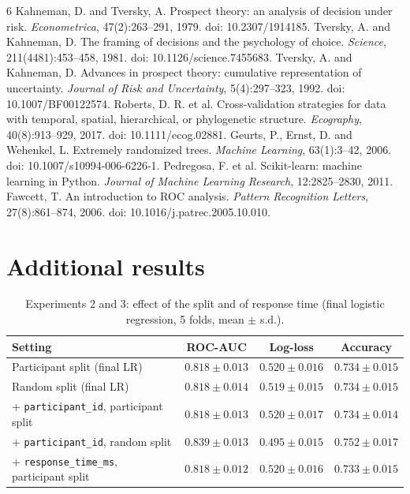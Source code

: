 \documentclass[11pt,a4paper]{article}
\begin{document}

\begin{thebibliography}{6}
Kahneman, D. and Tversky, A. Prospect theory: an analysis of decision under risk.
\emph{Econometrica}, 47(2):263--291, 1979. doi: 10.2307/1914185.
Tversky, A. and Kahneman, D. The framing of decisions and the psychology of choice.
\emph{Science}, 211(4481):453--458, 1981. doi: 10.1126/science.7455683.
Tversky, A. and Kahneman, D. Advances in prospect theory: cumulative representation of uncertainty.
\emph{Journal of Risk and Uncertainty}, 5(4):297--323, 1992. doi: 10.1007/BF00122574.
Roberts, D. R. et al. Cross-validation strategies for data with temporal, spatial, hierarchical, or phylogenetic structure.
\emph{Ecography}, 40(8):913--929, 2017. doi: 10.1111/ecog.02881.
Geurts, P., Ernst, D. and Wehenkel, L. Extremely randomized trees.
\emph{Machine Learning}, 63(1):3--42, 2006. doi: 10.1007/s10994-006-6226-1.
Pedregosa, F. et al. Scikit-learn: machine learning in Python.
\emph{Journal of Machine Learning Research}, 12:2825--2830, 2011.
Fawcett, T. An introduction to ROC analysis.
\emph{Pattern Recognition Letters}, 27(8):861--874, 2006. doi: 10.1016/j.patrec.2005.10.010.
\end{thebibliography}

\appendix
\section{Additional results}

\begin{table}[ht]
\centering
\caption{Experiments 2 and 3: effect of the split and of response time (final logistic regression, 5 folds, mean $\pm$ s.d.).}\label{tab:exp23}
\small
\begin{tabularx}{\linewidth}{@{}Xccc@{}}
\toprule
Setting & ROC-AUC & Log-loss & Accuracy \\
\midrule
Participant split (final LR)          & $0.818\pm0.013$ & $0.520\pm0.016$ & $0.734\pm0.015$ \\
Random split (final LR)               & $0.818\pm0.014$ & $0.519\pm0.015$ & $0.734\pm0.015$ \\
+ \texttt{participant\_id}, participant split & $0.818\pm0.013$ & $0.520\pm0.017$ & $0.734\pm0.014$ \\
+ \texttt{participant\_id}, random split      & $0.839\pm0.013$ & $0.495\pm0.015$ & $0.752\pm0.017$ \\
+ \texttt{response\_time\_ms}, participant split & $0.818\pm0.012$ & $0.520\pm0.016$ & $0.733\pm0.015$ \\
\bottomrule
\end{tabularx}
\end{table}
\end{document}
